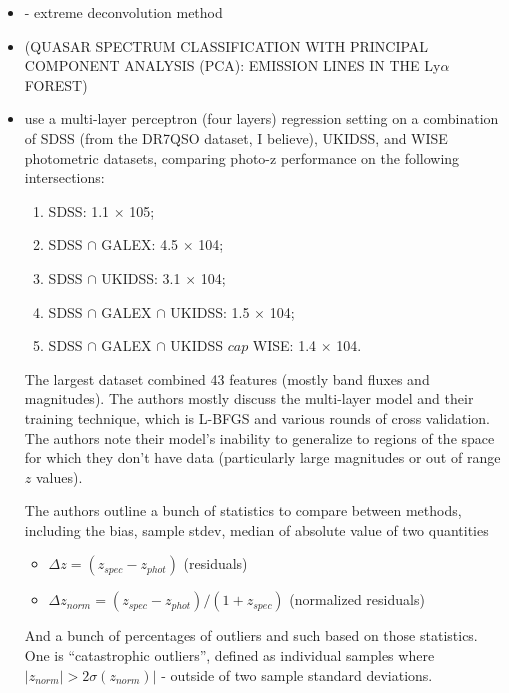 \documentclass[11pt]{article}
\begin{document}
\begin{itemize}
\item \cite{bovy2012photometric} - extreme deconvolution method

\item \cite{suzuki2006quasar} (QUASAR SPECTRUM CLASSIFICATION WITH PRINCIPAL COMPONENT ANALYSIS (PCA): EMISSION LINES IN THE Ly$\alpha$ FOREST)

\item \cite{brescia2013photometric} use a multi-layer perceptron (four layers) regression setting on a combination of SDSS (from the DR7QSO dataset, I believe), UKIDSS, and WISE photometric datasets, comparing photo-z performance on the following intersections:   
  \begin{enumerate}
  \item SDSS: 1.1 $\times$ 105;
  \item SDSS $\cap$ GALEX: 4.5 $\times$ 104;
  \item SDSS $\cap$ UKIDSS: 3.1 $\times$ 104;
  \item SDSS $\cap$ GALEX $\cap$ UKIDSS: 1.5 $\times$ 104;
  \item SDSS $\cap$ GALEX $\cap$ UKIDSS $cap$ WISE: 1.4 $\times$ 104.
  \end{enumerate}
The largest dataset combined 43 features (mostly band fluxes and magnitudes).  
The authors mostly discuss the multi-layer model and their training technique, which is L-BFGS and various rounds of cross validation.   The authors note their model's inability to generalize to regions of the space for which they don't have data (particularly large magnitudes or out of range $z$ values). 

The authors outline a bunch of statistics to compare between methods, including the bias, sample stdev, median of absolute value of two quantities
  \begin{itemize}
  \item $\Delta z = (z_{spec} - z_{phot})$ (residuals) 
  \item $\Delta z_{norm} = (z_{spec} - z_{phot}) / (1 + z_{spec})$ (normalized residuals)
  \end{itemize}
And a bunch of percentages of outliers and such based on those statistics.  One is ``catastrophic outliers'', defined as individual samples where $|z_{norm}| > 2 \sigma(z_{norm})|$ - outside of two sample standard deviations.  


\end{itemize}
\end{document}
